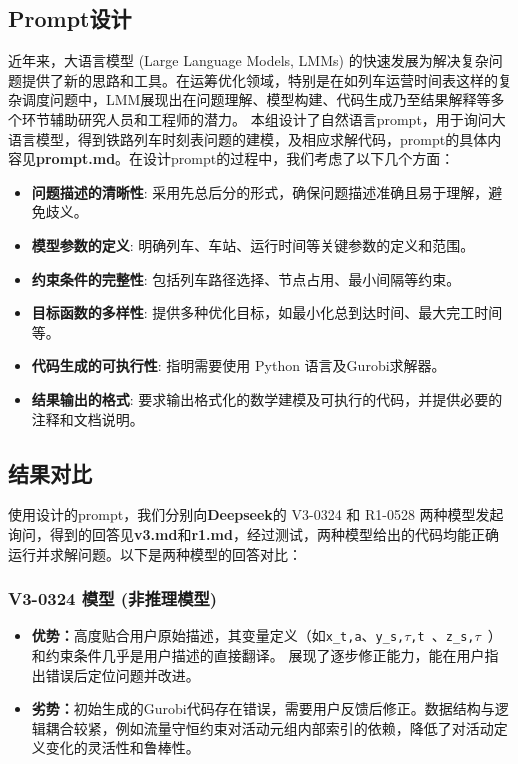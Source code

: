\documentclass{article}
\begin{document}
    \subsection{Prompt设计}
    近年来，大语言模型 (Large Language Models, LMMs)
    的快速发展为解决复杂问题提供了新的思路和工具。在运筹优化领域，特别是在如列车运营时间表这样的复杂调度问题中，LMM展现出在问题理解、模型构建、代码生成乃至结果解释等多个环节辅助研究人员和工程师的潜力。
    本组设计了自然语言prompt，用于询问大语言模型，得到铁路列车时刻表问题的建模，及相应求解代码，prompt的具体内容见\textbf{prompt.md}。在设计prompt的过程中，我们考虑了以下几个方面：
    \begin{itemize}
        \item \textbf{问题描述的清晰性}: 采用先总后分的形式，确保问题描述准确且易于理解，避免歧义。
        \item \textbf{模型参数的定义}: 明确列车、车站、运行时间等关键参数的定义和范围。
        \item \textbf{约束条件的完整性}: 包括列车路径选择、节点占用、最小间隔等约束。
        \item \textbf{目标函数的多样性}: 提供多种优化目标，如最小化总到达时间、最大完工时间等。
        \item \textbf{代码生成的可执行性}: 指明需要使用 Python 语言及Gurobi求解器。
        \item \textbf{结果输出的格式}: 要求输出格式化的数学建模及可执行的代码，并提供必要的注释和文档说明。
    \end{itemize}

    \subsection{结果对比}
    使用设计的prompt，我们分别向\textbf{Deepseek}的 V3-0324 和 R1-0528
    两种模型发起询问，得到的回答见\textbf{v3.md}和\textbf{r1.md}，经过测试，两种模型给出的代码均能正确运行并求解问题。以下是两种模型的回答对比：

    \subsubsection{V3-0324 模型 (非推理模型)}
    \begin{itemize}
        \item
        \textbf{优势：}高度贴合用户原始描述，其变量定义（如\texttt{x\_t,a}、\texttt{y\_s,$\tau$,t }、\texttt{z\_s,$\tau$ }）和约束条件几乎是用户描述的直接翻译。
        展现了逐步修正能力，能在用户指出错误后定位问题并改进。
        \item
        \textbf{劣势：}初始生成的Gurobi代码存在错误，需要用户反馈后修正。数据结构与逻辑耦合较紧，例如流量守恒约束对活动元组内部索引的依赖，降低了对活动定义变化的灵活性和鲁棒性。
    \end{itemize}
\end{document}
